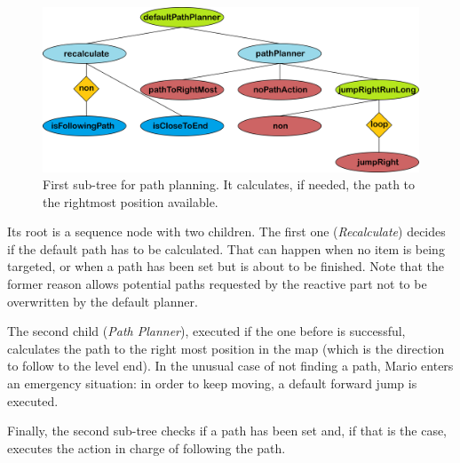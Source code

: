 \documentclass[conference]{IEEEtran}
\begin{document}
\begin{figure} [ht]
	\begin{center}
	\includegraphics[scale=0.073]{images/lastButOne2}
	\caption{First sub-tree for path planning. It calculates, if needed, the path
	to the rightmost position available.}
	\label{fig:lastButOne}
	\end{center}
\end{figure}

Its root is a sequence node with two children. 
The first one (\textit{Recalculate}) decides if the default path 
has to be calculated. That can happen when no item is being targeted,
or when a path has been set but is about to be finished. Note that the former
reason allows potential paths requested by the reactive part not 
to be overwritten by the default planner. 

The second child (\textit{Path Planner}), executed if the one before 
is successful, calculates the path to the right most position in the 
map (which is the direction to follow to the level end). In the unusual 
case of not finding a path, Mario enters an emergency situation: in order 
to keep moving, a default forward jump is executed.

Finally, the second sub-tree checks if a path
has been set and, if that is the case, executes the action in charge of following the path.


\end{document}
